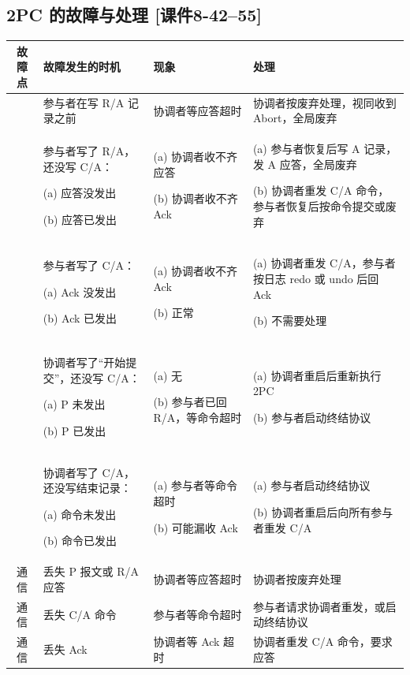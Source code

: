 \documentclass[10pt,a4paper]{article}
\newcommand{\bcir}[1]{\ding{\numexpr181+#1\relax}}
\newcommand{\kj}[1]{\textsf{\small[课件#1]}}
\begin{document}
\subsection{2PC 的故障与处理 \kj{8-42--55}}\label{s:fail}
{\small
\begin{tabularx}{\linewidth}{@{}c >{\raggedright\arraybackslash}p{4.6cm} >{\raggedright\arraybackslash}p{3.6cm} X@{}}
\toprule
故障点 & 故障发生的时机 & 现象 & 处理\\ \midrule
\bcir{1} & 参与者在写 R/A 记录之前 & 协调者等应答超时 & 协调者按废弃处理，视同收到 Abort，全局废弃\\
\bcir{2} & 参与者写了 R/A，还没写 C/A：\par (a) 应答没发出 \par (b) 应答已发出 & (a) 协调者收不齐应答 \par (b) 协调者收不齐 Ack & (a) 参与者恢复后写 A 记录，发 A 应答，全局废弃 \par (b) 协调者重发 C/A 命令，参与者恢复后按命令提交或废弃\\
\bcir{3} & 参与者写了 C/A：\par (a) Ack 没发出 \par (b) Ack 已发出 & (a) 协调者收不齐 Ack \par (b) 正常 & (a) 协调者重发 C/A，参与者按日志 redo 或 undo 后回 Ack \par (b) 不需要处理\\
\bcir{4} & 协调者写了“开始提交”，还没写 C/A：\par (a) P 未发出 \par (b) P 已发出 & (a) 无 \par (b) 参与者已回 R/A，等命令超时 & (a) 协调者重启后重新执行 2PC \par (b) 参与者启动终结协议\\
\bcir{5} & 协调者写了 C/A，还没写结束记录：\par (a) 命令未发出 \par (b) 命令已发出 & (a) 参与者等命令超时 \par (b) 可能漏收 Ack & (a) 参与者启动终结协议 \par (b) 协调者重启后向所有参与者重发 C/A\\ \midrule
通信 & 丢失 P 报文或 R/A 应答 & 协调者等应答超时 & 协调者按废弃处理\\
通信 & 丢失 C/A 命令 & 参与者等命令超时 & 参与者请求协调者重发，或启动终结协议\\
通信 & 丢失 Ack & 协调者等 Ack 超时 & 协调者重发 C/A 命令，要求应答\\
\bottomrule
\end{tabularx}}
\end{document}
